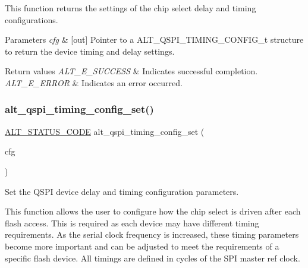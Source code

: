 This function returns the settings of the chip select delay and timing configurations.


\begin{DoxyParams}{Parameters}
{\em cfg} & \mbox{[}out\mbox{]} Pointer to a A\+L\+T\+\_\+\+Q\+S\+P\+I\+\_\+\+T\+I\+M\+I\+N\+G\+\_\+\+C\+O\+N\+F\+I\+G\+\_\+t structure to return the device timing and delay settings.\\
\hline
\end{DoxyParams}

\begin{DoxyRetVals}{Return values}
{\em A\+L\+T\+\_\+\+E\+\_\+\+S\+U\+C\+C\+E\+SS} & Indicates successful completion. \\
\hline
{\em A\+L\+T\+\_\+\+E\+\_\+\+E\+R\+R\+OR} & Indicates an error occurred. \\
\hline
\end{DoxyRetVals}
\mbox{\label{group__ALT__QSPI__DEV__CFG_ga1d0afe5312fe0294ef67f6525c52cf1e}} 
\subsubsection{\texorpdfstring{alt\_qspi\_timing\_config\_set()}{alt\_qspi\_timing\_config\_set()}}
{\footnotesize\ttfamily \mbox{\hyperlink{hwlib_8h_abdb0d369f069723ca55d6c94bcaaaa12}{A\+L\+T\+\_\+\+S\+T\+A\+T\+U\+S\+\_\+\+C\+O\+DE}} alt\+\_\+qspi\+\_\+timing\+\_\+config\+\_\+set (\begin{DoxyParamCaption}\item[{const \mbox{\hyperlink{group__ALT__QSPI__DEV__CFG_ga81b5f892a981d0ecb8fb454b3a1e1230}{A\+L\+T\+\_\+\+Q\+S\+P\+I\+\_\+\+T\+I\+M\+I\+N\+G\+\_\+\+C\+O\+N\+F\+I\+G\+\_\+t}} $\ast$}]{cfg }\end{DoxyParamCaption})}

Set the Q\+S\+PI device delay and timing configuration parameters.

This function allows the user to configure how the chip select is driven after each flash access. This is required as each device may have different timing requirements. As the serial clock frequency is increased, these timing parameters become more important and can be adjusted to meet the requirements of a specific flash device. All timings are defined in cycles of the S\+PI master ref clock.

